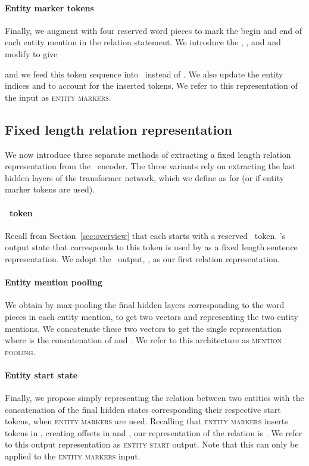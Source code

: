 \paragraph{Entity marker tokens}
Finally, we augment  with four reserved word pieces to mark the begin and end of each entity mention in the relation statement. 
We introduce the  , ,  and  and modify 
 to give

and we feed this token sequence into \bert~instead of . We also update the entity indices  and  to account for the inserted tokens.
We refer to this representation of the input as \textsc{entity markers}.

\subsection{Fixed length relation representation}
\label{sec:relation-rep}
We now introduce three separate methods of extracting a fixed length relation representation  from the \bert~encoder.
The three variants rely on extracting the last hidden layers of the transformer network, which we define as  for  (or  if entity marker tokens are used). 

\paragraph{\cls~token} Recall from Section~\ref{sec:overview} that each  starts with a reserved \cls~token. \bert's output state that corresponds to this token is used by \citet{devlin2018bert} as a fixed length sentence representation. We adopt the \cls~output, , as our first relation representation.

\paragraph{Entity mention pooling}
We obtain  by max-pooling the final hidden layers  corresponding to the word pieces in each entity mention, to get two vectors  and  representing the two entity mentions. We concatenate these two vectors to get the single representation 
 where  is the concatenation of  and . 
We refer to this architecture as \textsc{mention pooling}.

\paragraph{Entity start state}
Finally, we propose simply representing the relation between two entities with the concatenation of the final hidden states corresponding their respective start tokens, when \textsc{entity markers} are used. 
Recalling that \textsc{entity markers} inserts tokens in , creating offsets in  and , our representation of the relation is .  We refer to this output representation as
   \textsc{entity start} output. Note that this can only be applied to the \textsc{entity markers} input.

